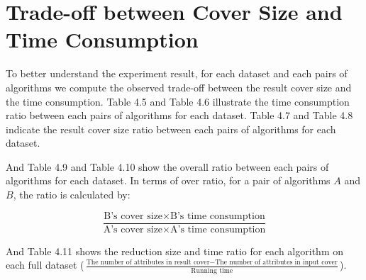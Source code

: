 \documentclass[11pt]{book}
\begin{document}
\section{Trade-off between Cover Size and Time Consumption}

To better understand the experiment result, for each dataset and each pairs of algorithms we compute the observed trade-off between the result cover size and the time consumption. Table 4.5 and Table 4.6 illustrate the time consumption ratio between each pairs of algorithms for each dataset. Table 4.7 and Table 4.8 indicate the result cover size ratio between each pairs of algorithms for each dataset.

And Table 4.9 and Table 4.10 show the overall ratio between each pairs of algorithms for each dataset. In terms of over ratio, for a pair of algorithms $A$ and $B$, the ratio is calculated by:

$$
\frac
	{\text{B's cover size} \times \text{B's time consumption}}
	{\text{A's cover size} \times \text{A's time consumption}}
$$

And Table 4.11 shows the reduction size and time ratio for each algorithm on each full dataset ($\frac{\text{The number of attributes in result cover} - \text{The number of attributes in input cover}}{\text{Running time}}$).
\end{document}
